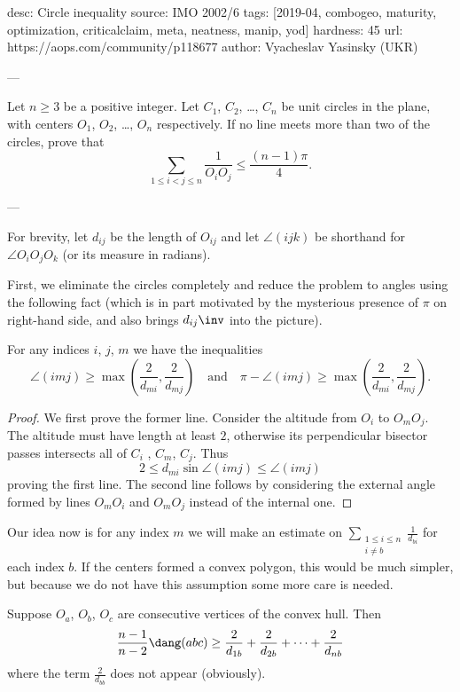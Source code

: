 desc: Circle inequality
source: IMO 2002/6
tags: [2019-04, combogeo, maturity, optimization, criticalclaim, meta, neatness, manip, yod]
hardness: 45
url: https://aops.com/community/p118677
author: Vyacheslav Yasinsky (UKR)

---

Let $n \ge 3$ be a positive integer.
Let $C_1$, $C_2$, \dots, $C_n$ be unit circles in the plane,
with centers $O_1$, $O_2$, \dots, $O_n$ respectively.
If no line meets more than two of the circles, prove that
\[ \sum_{1 \le i < j \le n } \frac{1}{O_i O_j}
  \le \frac{(n-1)\pi}{4}. \]

---

For brevity, let $d_{ij}$ be the length of $O_{ij}$
and let $\angle(ijk)$ be shorthand for $\angle O_i O_j O_k$
(or its measure in radians).

First, we eliminate the circles completely
and reduce the problem to angles using the following fact
(which is in part motivated by the mysterious
presence of $\pi$ on right-hand side,
and also brings $d_{ij}\inv$ into the picture).

\begin{lemma*}
  For any indices $i$, $j$, $m$ we have the inequalities
  \[ \angle (imj) \ge
      \max \left( \frac{2}{d_{mi}}, \frac{2}{d_{mj}} \right)
      \quad\text{and}\quad
    \pi - \angle (imj) \ge
    \max \left( \frac{2}{d_{mi}}, \frac{2}{d_{mj}} \right). \]
\end{lemma*}
\begin{proof}
  We first prove the former line.
  Consider the altitude from $O_i$ to $O_m O_j$.
  The altitude must have length at least $2$,
  otherwise its perpendicular bisector passes
  intersects all of $C_i$ , $C_m$, $C_j$.
  Thus
  \[ 2 \le d_{mi} \sin \angle(imj) \le \angle(imj) \]
  proving the first line.
  The second line follows by considering the external
  angle formed by lines $O_m O_i$ and $O_m O_j$
  instead of the internal one.
\end{proof}

Our idea now is for any index $m$
we will make an estimate on
$\sum_{\substack{1 \le i \le n \\ i \neq b}} \frac{1}{d_{bi}}$
for each index $b$.
If the centers formed a convex polygon,
this would be much simpler,
but because we do not have this assumption some more care is needed.

\begin{claim*}
  Suppose $O_a$, $O_b$, $O_c$ are consecutive vertices
  of the convex hull.
  Then
  \[ \frac{n-1}{n-2} \dang(abc) \ge \frac{2}{d_{1b}} + \frac{2}{d_{2b}}
    + \dots + \frac{2}{d_{nb}} \]
  where the term $\frac{2}{d_{bb}}$ does not appear (obviously).
\end{claim*}

